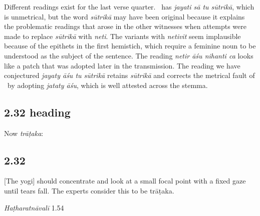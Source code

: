 \begin{ekdosis}
\begin{philcomm}[hp02_031]
Different readings exist for the last verse quarter. \etaOne\ has \emph{jayati sā tu sūtrikā}, which is unmetrical, but the word \emph{sūtrikā} may have been original because it explains the problematic readings that arose in the other witnesses when attempts were made to replace \emph{sūtrikā} with \emph{neti}. The variants with \emph{netivit} seem implausible because of the epithets in the first hemistich, which require a feminine noun to be understood as the subject of the sentence. The reading \emph{netir āśu nihanti ca} looks like a patch that was adopted later in the transmission. The reading we have conjectured \emph{jayaty āśu tu sūtrikā} retains \emph{sūtrikā} and corrects the metrical fault of \etaOne\ by adopting \emph{jataty āśu}, which is well attested across the stemma.
\end{philcomm}

\subsection*{2.32 heading}
\begin{translation}[hp02_032a]
Now \emph{trāṭaka}:
\end{translation}


\subsection*{2.32}
\begin{translation}[hp02_032]
{}[The yogi] should concentrate and look at a small focal point with a fixed gaze until tears fall. The experts consider this to be trāṭaka.
\end{translation}


\begin{testimonia}[hp02_032]
\emph{Haṭharatnāvalī} 1.54

\begin{versinnote}
\end{versinnote}


\end{testimonia}
\end{ekdosis}

